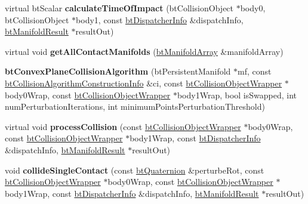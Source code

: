 \begin{DoxyCompactItemize}
virtual bt\+Scalar {\bfseries calculate\+Time\+Of\+Impact} (bt\+Collision\+Object $\ast$body0, bt\+Collision\+Object $\ast$body1, const \hyperlink{structbtDispatcherInfo}{bt\+Dispatcher\+Info} \&dispatch\+Info, \hyperlink{classbtManifoldResult}{bt\+Manifold\+Result} $\ast$result\+Out)
\item 
\mbox{\label{classbtConvexPlaneCollisionAlgorithm_a9c5fc2f47f528052d57c2d2158f5e05e}} 
virtual void {\bfseries get\+All\+Contact\+Manifolds} (\hyperlink{classbtAlignedObjectArray}{bt\+Manifold\+Array} \&manifold\+Array)
\item 
\mbox{\label{classbtConvexPlaneCollisionAlgorithm_a60f101519c99326f756d07e1218291ca}} 
{\bfseries bt\+Convex\+Plane\+Collision\+Algorithm} (bt\+Persistent\+Manifold $\ast$mf, const \hyperlink{structbtCollisionAlgorithmConstructionInfo}{bt\+Collision\+Algorithm\+Construction\+Info} \&ci, const \hyperlink{structbtCollisionObjectWrapper}{bt\+Collision\+Object\+Wrapper} $\ast$body0\+Wrap, const \hyperlink{structbtCollisionObjectWrapper}{bt\+Collision\+Object\+Wrapper} $\ast$body1\+Wrap, bool is\+Swapped, int num\+Perturbation\+Iterations, int minimum\+Points\+Perturbation\+Threshold)
\item 
\mbox{\label{classbtConvexPlaneCollisionAlgorithm_a3840253ab8d229a4d947b4f3410b2b00}} 
virtual void {\bfseries process\+Collision} (const \hyperlink{structbtCollisionObjectWrapper}{bt\+Collision\+Object\+Wrapper} $\ast$body0\+Wrap, const \hyperlink{structbtCollisionObjectWrapper}{bt\+Collision\+Object\+Wrapper} $\ast$body1\+Wrap, const \hyperlink{structbtDispatcherInfo}{bt\+Dispatcher\+Info} \&dispatch\+Info, \hyperlink{classbtManifoldResult}{bt\+Manifold\+Result} $\ast$result\+Out)
\item 
\mbox{\label{classbtConvexPlaneCollisionAlgorithm_a79f8384fcdc2145be9fca0057edc8b69}} 
void {\bfseries collide\+Single\+Contact} (const \hyperlink{classbtQuaternion}{bt\+Quaternion} \&perturbe\+Rot, const \hyperlink{structbtCollisionObjectWrapper}{bt\+Collision\+Object\+Wrapper} $\ast$body0\+Wrap, const \hyperlink{structbtCollisionObjectWrapper}{bt\+Collision\+Object\+Wrapper} $\ast$body1\+Wrap, const \hyperlink{structbtDispatcherInfo}{bt\+Dispatcher\+Info} \&dispatch\+Info, \hyperlink{classbtManifoldResult}{bt\+Manifold\+Result} $\ast$result\+Out)

\end{DoxyCompactItemize}
